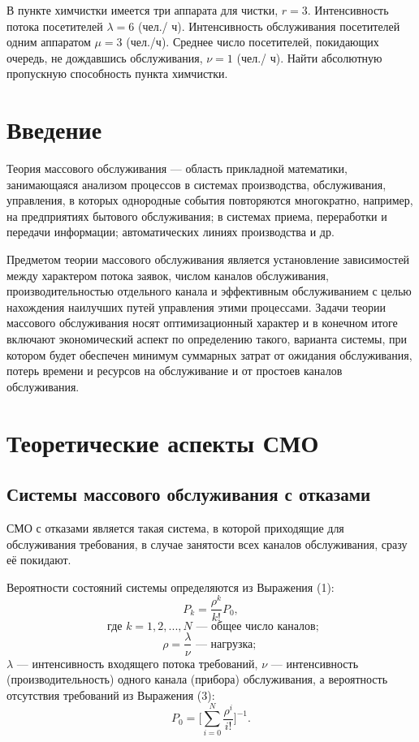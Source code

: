 \documentclass[14pt]{extarticle}
\begin{document}
    В пункте химчистки имеется три аппарата для чистки, $r = 3$.   Интенсивность потока посетителей $\lambda  = 6$ (чел./ ч). Интенсивность обслуживания посетителей одним аппаратом $\mu = 3$ (чел./ч). Среднее число посетителей, покидающих очередь, не дождавшись обслуживания, $\nu = 1$ (чел./ ч). Найти абсолютную пропускную способность пункта химчистки.

    \newpage

    \section*{Введение}

    Теория массового обслуживания --- область прикладной математики, занимающаяся анализом процессов в системах производства, обслуживания, управления, в которых однородные события повторяются многократно, например, на предприятиях бытового обслуживания; в системах приема, переработки и передачи информации; автоматических линиях производства и др.

    Предметом теории массового обслуживания является установление зависимостей между характером потока заявок, числом каналов обслуживания, производительностью отдельного канала и эффективным обслуживанием с целью нахождения наилучших путей управления этими процессами. Задачи теории массового обслуживания носят оптимизационный характер и в конечном итоге включают экономический аспект по определению такого, варианта системы, при котором будет обеспечен минимум суммарных затрат от ожидания обслуживания, потерь времени и ресурсов на обслуживание и от простоев каналов обслуживания.

    \newpage

    \section{Теоретические аспекты СМО}

    \subsection{Системы массового обслуживания с отказами}

    СМО с отказами является такая система, в которой приходящие для обслуживания требования, в случае занятости всех каналов обслуживания, сразу её покидают.

    Вероятности состояний системы определяются из Выражения (1):
    \begin{equation} P_k = \frac{\rho^k}{k!} P_0, \end{equation}
    $$ \text{ где } k = 1, 2, ..., N \text{ --- общее число каналов;}$$
    \begin{equation} \rho = \frac{\lambda}{\nu} \text{ --- нагрузка; } \end{equation}
    $\lambda$ --- интенсивность входящего потока требований, $\nu$ --- интенсивность (производительность) одного канала (прибора) обслуживания, а вероятность отсутствия требований из Выражения (3):
    \begin{equation} P_0 = \Bigg[ \sum_{ i = 0 }^N \frac{\rho^i}{i!} \Bigg]^{-1}. \end{equation}
\end{document}
